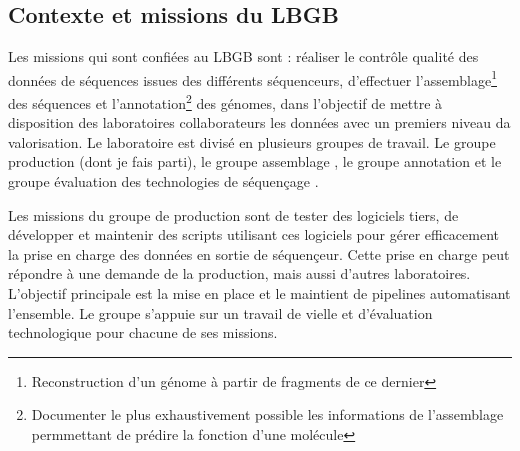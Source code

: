 \subsection{Contexte et missions du LBGB}
Les missions qui sont confiées au LBGB sont : réaliser le contrôle qualité des données de séquences issues des différents séquenceurs, d'effectuer l'assemblage\footnote{Reconstruction d'un génome à partir de fragments de ce dernier} des séquences et l'annotation\footnote{Documenter le plus exhaustivement possible les informations de l'assemblage permmettant de prédire la fonction d'une molécule} des génomes, dans l'objectif de mettre à disposition des laboratoires collaborateurs les données avec un premiers niveau da valorisation. Le laboratoire est divisé en plusieurs groupes de travail. Le groupe \og production \fg{} (dont je fais parti), le groupe \og assemblage \fg{}, le groupe \og annotation \fg{} et le groupe \og évaluation des technologies de séquençage \fg{}.

Les missions du groupe de \og production \fg{} sont de tester des logiciels tiers, de développer et maintenir des scripts utilisant ces logiciels pour gérer efficacement la prise en charge des données en sortie de séquençeur. Cette prise en charge peut répondre à une demande de la production, mais aussi d'autres laboratoires. L'objectif principale est la mise en place et le maintient de pipelines automatisant l'ensemble. Le groupe s'appuie sur un travail de vielle et d'évaluation technologique pour chacune de ses missions. 



